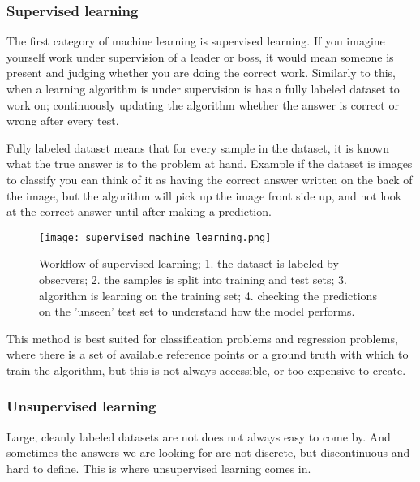 \documentclass[thesis.tex]{subfiles}
\begin{document}
\subsubsection{Supervised learning} \label{sec:supervised_learnign}
The first category of machine learning is supervised learning. If you imagine yourself work under supervision of a leader or boss, it would mean someone is present and judging whether you are doing the correct work. Similarly to this, when a learning algorithm is under supervision is has a fully labeled dataset to work on; continuously updating the algorithm whether the answer is correct or wrong after every test.

Fully labeled dataset means that for every sample in the dataset, it is known what the true answer is to the problem at hand. Example if the dataset is images to classify you can think of it as having the correct answer written on the back of the image, but the algorithm will pick up the image front side up, and not look at the correct answer until after making a prediction.

\begin{figure}[h] %
  \begin{center}
    \texttt{[image: supervised\_machine\_learning.png]}
    \caption[Workflow of supervised machine learning.]{Workflow of supervised learning; 1. the dataset is labeled by observers; 2. the samples is split into training and test sets; 3. algorithm is learning on the training set; 4. checking the predictions on the 'unseen' test set to understand how the model performs.}
    \label{fig:supervised_machine_learning}
  \end{center}
\end{figure}

This method is best suited for classification problems and regression problems, where there is a set of available reference points or a ground truth with which to train the algorithm, but this is not always accessible, or too expensive to create.


\subsubsection{Unsupervised learning} \label{sec:unsupervised_learning}
Large, cleanly labeled datasets are not does not always easy to come by. And sometimes the answers we are looking for are not discrete, but discontinuous and hard to define. This is where unsupervised learning comes in.
\end{document}
